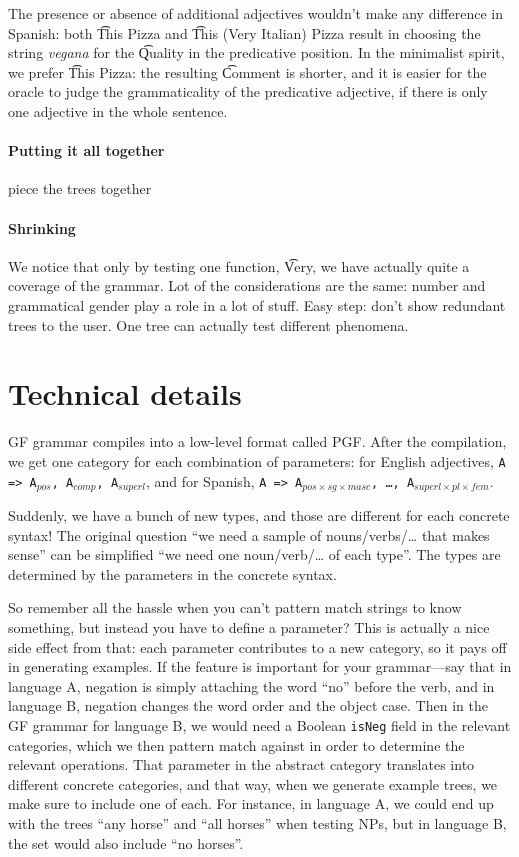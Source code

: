 The presence or absence of additional adjectives wouldn't make any difference in Spanish: both \t{This Pizza} and \t{This (Very Italian) Pizza} result in choosing the string \emph{vegana} for the \t{Quality} in the predicative position. In the minimalist spirit, we prefer \t{This Pizza}: the resulting \t{Comment} is shorter, and it is easier for the oracle to judge the grammaticality of the predicative adjective, if there is only one adjective in the whole sentence.

\paragraph{Putting it all together}

piece the trees together

\paragraph{Shrinking}
We notice that only by testing one function, \t{Very}, we have actually quite a coverage of the grammar. 
Lot of the considerations are the same: number and grammatical gender play a role in a lot of stuff.
Easy step: don't show redundant trees to the user. One tree can actually test different phenomena.

\section{Technical details}

GF grammar compiles into a low-level format called PGF. After the
compilation, we get one category for each combination of parameters:
for English adjectives, \texttt{A => A$_{pos}$, A$_{comp}$,
A$_{superl}$}, and for Spanish, \texttt{A => A$_{pos×sg×masc}$, \dots,
A$_{superl×pl×fem}$}. 

Suddenly, we have a bunch of new types, and those are different for
each concrete syntax! The original question ``we need a sample of
nouns/verbs/… that makes sense'' can be simplified ``we need one
noun/verb/… of each type''. The types are determined by the parameters
in the concrete syntax. 

So remember all the hassle when you can't pattern match strings to
know something, but instead you have to define a parameter? This is
actually a nice side effect from that: each parameter contributes to a
new category, so it pays off in generating examples. If the feature is
important for your grammar---say that in language A, negation is
simply attaching the word  ``no'' before the verb, and in language B,
negation changes the word order and the object case. Then in the GF
grammar for language B, we would need a Boolean \texttt{isNeg} field
in the relevant categories, which we then pattern match against in
order to determine the relevant operations. That parameter in the
abstract category translates into different concrete categories, and
that way, when we generate example trees, we make sure to include one
of each. For instance, in language A, we could end up with the trees
``any horse'' and ``all horses'' when testing NPs, but in language B,
the set would also include ``no horses''. 



